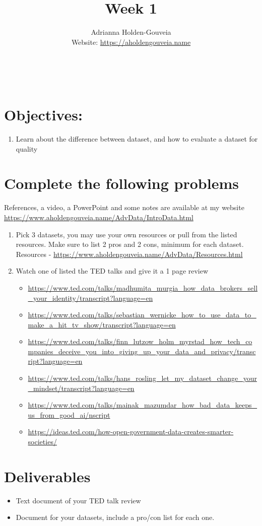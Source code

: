 \documentclass[12pt]{article}
\title{Week 1}
\author{
        Adrianna Holden-Gouveia \\
        Website: \url{https://aholdengouveia.name}\\ 
        \date{\vspace{-5ex}}
        \faLinkedin{: aholdengouveia} \\
        \faGithub {: aholdengouveia} \\
        }
\begin{document}
    

\maketitle


\section*{Objectives:}
\begin{enumerate}
    \item Learn about the difference between dataset, and how to evaluate a dataset for quality
\end{enumerate}
\section*{Complete the following problems}

References, a video, a PowerPoint and some notes are available at my website
\url {https://www.aholdengouveia.name/AdvData/IntroData.html}


    \begin{enumerate}
        \item Pick 3 datasets, you may use your own resources or pull from the listed resources.  Make sure to list 2 pros and 2 cons, minimum for each dataset.  Resources - \url{https://www.aholdengouveia.name/AdvData/Resources.html}
        \item Watch one of listed the TED talks and give it a 1 page review
            \begin{itemize}
                \item  \url{https://www.ted.com/talks/madhumita_murgia_how_data_brokers_sell_your_identity/transcript?language=en}
                \item \url{https://www.ted.com/talks/sebastian_wernicke_how_to_use_data_to_make_a_hit_tv_show/transcript?language=en}
                \item \url{https://www.ted.com/talks/finn_lutzow_holm_myrstad_how_tech_companies_deceive_you_into_giving_up_your_data_and_privacy/transcript?language=en}
                \item \url{https://www.ted.com/talks/hans_rosling_let_my_dataset_change_your_mindset/transcript?language=en} 
                \item \url{https://www.ted.com/talks/mainak_mazumdar_how_bad_data_keeps_us_from_good_ai/nscript} 
                \item \url{https://ideas.ted.com/how-open-government-data-creates-smarter-societies/}
            \end{itemize}
    \end{enumerate}



\section*{Deliverables}
\begin{itemize}
    \item Text document of your TED talk review
    \item Document for your datasets, include a pro/con list for each one.
\end{itemize}
\end{document}

